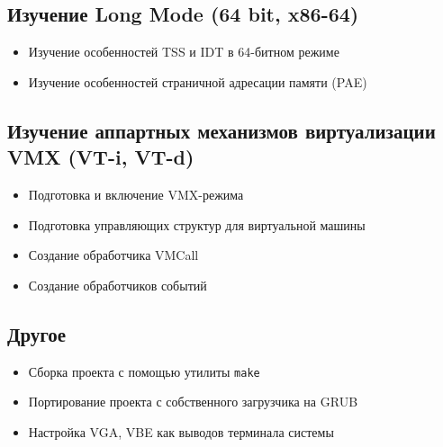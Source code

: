 \documentclass[a4paper,11pt]{extarticle}
\begin{document}
\subsection{Изучение Long Mode (64 bit, x86-64)}
\begin{itemize}
	\item Изучение особенностей TSS и IDT в 64-битном режиме
	\item Изучение особенностей страничной адресации памяти (PAE)
\end{itemize}
\subsection{Изучение аппартных механизмов виртуализации VMX (VT-i, VT-d)}
\begin{itemize}
	\item Подготовка и включение VMX-режима
	\item Подготовка управляющих структур для виртуальной машины
	\item Создание обработчика VMCall
	\item Создание обработчиков событий
\end{itemize}
\subsection{Другое}
\begin{itemize}
	\item Сборка проекта с помощью утилиты \texttt{make}
	\item Портирование проекта с собственного загрузчика на GRUB
	\item Настройка VGA, VBE как выводов терминала системы
\end{itemize}
\end{document}
